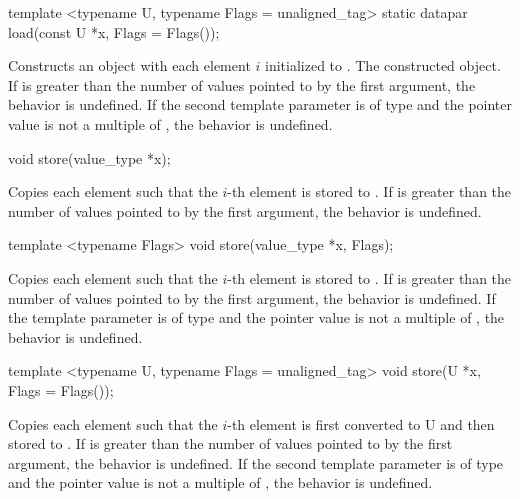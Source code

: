 \begin{wgText}
  \begin{itemdecl}
template <typename U, typename Flags = unaligned_tag> static datapar load(const U *x, Flags = Flags());
  \end{itemdecl}
  \begin{itemdescr}
    \pnum\effects Constructs an object with each element $i$ initialized to .
    \pnum\returns The constructed object.
    \pnum\remarks If \datapar{} is greater than the number of values pointed to by the first argument, the behavior is undefined.
    \pnum         If the second template parameter is of type  and the pointer value is not a multiple of , the behavior is undefined.
  \end{itemdescr}

  \begin{itemdecl}
void store(value_type *x);
  \end{itemdecl}
  \begin{itemdescr}
    \pnum\effects Copies each element such that the $i$-th element is stored to .
    \pnum\remarks If \datapar{} is greater than the number of values pointed to by the first argument, the behavior is undefined.
  \end{itemdescr}

  \begin{itemdecl}
template <typename Flags> void store(value_type *x, Flags);
  \end{itemdecl}
  \begin{itemdescr}
    \pnum\effects Copies each element such that the $i$-th element is stored to .
    \pnum\remarks If \datapar{} is greater than the number of values pointed to by the first argument, the behavior is undefined.
    \pnum         If the template parameter is of type  and the pointer value is not a multiple of , the behavior is undefined.
  \end{itemdescr}

  \begin{itemdecl}
template <typename U, typename Flags = unaligned_tag> void store(U *x, Flags = Flags());
  \end{itemdecl}
  \begin{itemdescr}
    \pnum\effects Copies each element such that the $i$-th element is first converted to \type U and then stored to .
    \pnum\remarks If \datapar{} is greater than the number of values pointed to by the first argument, the behavior is undefined.
    \pnum         If the second template parameter is of type  and the pointer value is not a multiple of , the behavior is undefined.
  \end{itemdescr}


\end{wgText}
